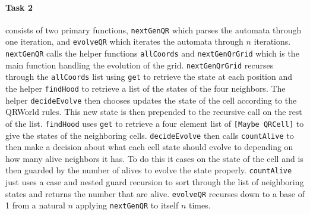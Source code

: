 \documentclass[11pt]{article}
\begin{document}
\paragraph{Task 2} consists of two primary functions, \verb|nextGenQR| which parses the automata through one iteration, and \verb|evolveQR| which iterates the automata through $n$ iterations. \verb|nextGenQR| calls the helper functions \verb|allCoords| and \verb|nextGenQrGrid| which is the main function handling the evolution of the grid.
\verb|nextGenQrGrid| recurses through the \verb|allCoords| list using \verb|get| to retrieve the state at each position and the helper \verb|findHood| to retrieve a list of the states of the four neighbors. The helper \verb|decideEvolve| then chooses updates the state of the cell according to the QRWorld rules. This new state is then prepended to the recursive call on the rest of the list.
\verb|findHood| uses \verb|get| to retrieve a four element list of \verb|[Maybe QRCell]| to give the states of the neighboring cells. \verb|decideEvolve| then calls \verb|countAlive| to then make a decision about what each cell state should evolve to depending on how many alive neighbors it has. To do this it cases on the state of the cell and is then guarded by the number of alives to evolve the state properly. \verb|countAlive| just uses a case and nested guard recursion to sort through the list of neighboring states and returns the number that are alive. \verb|evolveQR| recurses down to a base of 1 from a natural $n$ applying \verb|nextGenQR| to itself $n$ times.

\newpage
\end{document}
